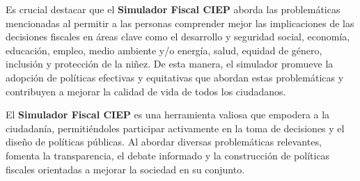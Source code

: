 Es crucial destacar que el \textbf{Simulador Fiscal \acs{CIEP}} aborda las problemáticas mencionadas al permitir a las personas comprender mejor las implicaciones de las decisiones fiscales en áreas clave como el desarrollo y seguridad social, economía, educación, empleo, medio ambiente y/o energía, salud, equidad de género, inclusión y protección de la niñez. De esta manera, el simulador promueve la adopción de políticas efectivas y equitativas que abordan estas problemáticas y contribuyen a mejorar la calidad de vida de todos los ciudadanos.

El \textbf{Simulador Fiscal \acs{CIEP}} es una herramienta valiosa que empodera a la ciudadanía, permitiéndoles participar activamente en la toma de decisiones y el diseño de políticas públicas. Al abordar diversas problemáticas relevantes, fomenta la transparencia, el debate informado y la construcción de políticas fiscales orientadas a mejorar la sociedad en su conjunto.

\ifdefined\maindoc\else

\fi

